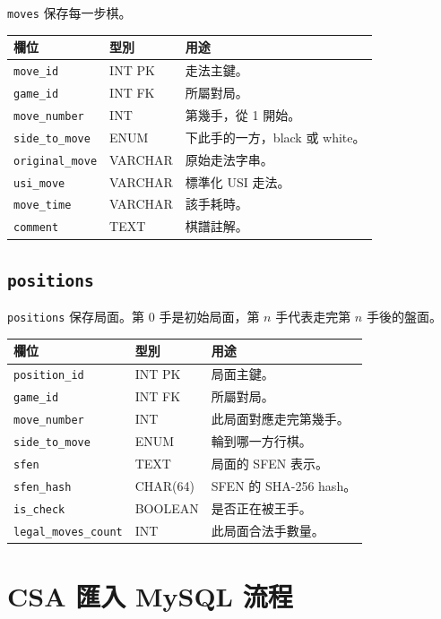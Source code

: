 \documentclass[12pt,a4paper,fontset=none]{ctexart}
\begin{document}
\texttt{moves} 保存每一步棋。

\begin{longtable}{p{}p{}p{}}
\toprule
\textbf{欄位} & \textbf{型別} & \textbf{用途}\\
\midrule
\endhead
\texttt{move\_id} & INT PK & 走法主鍵。\\
\texttt{game\_id} & INT FK & 所屬對局。\\
\texttt{move\_number} & INT & 第幾手，從 1 開始。\\
\texttt{side\_to\_move} & ENUM & 下此手的一方，black 或 white。\\
\texttt{original\_move} & VARCHAR & 原始走法字串。\\
\texttt{usi\_move} & VARCHAR & 標準化 USI 走法。\\
\texttt{move\_time} & VARCHAR & 該手耗時。\\
\texttt{comment} & TEXT & 棋譜註解。\\
\bottomrule
\end{longtable}

\subsection{\texttt{positions}}

\texttt{positions} 保存局面。第 0 手是初始局面，第 $n$ 手代表走完第 $n$ 手後的盤面。

\begin{longtable}{p{}p{}p{}}
\toprule
\textbf{欄位} & \textbf{型別} & \textbf{用途}\\
\midrule
\endhead
\texttt{position\_id} & INT PK & 局面主鍵。\\
\texttt{game\_id} & INT FK & 所屬對局。\\
\texttt{move\_number} & INT & 此局面對應走完第幾手。\\
\texttt{side\_to\_move} & ENUM & 輪到哪一方行棋。\\
\texttt{sfen} & TEXT & 局面的 SFEN 表示。\\
\texttt{sfen\_hash} & CHAR(64) & SFEN 的 SHA-256 hash。\\
\texttt{is\_check} & BOOLEAN & 是否正在被王手。\\
\texttt{legal\_moves\_count} & INT & 此局面合法手數量。\\
\bottomrule
\end{longtable}

\section{CSA 匯入 MySQL 流程}
\end{document}
